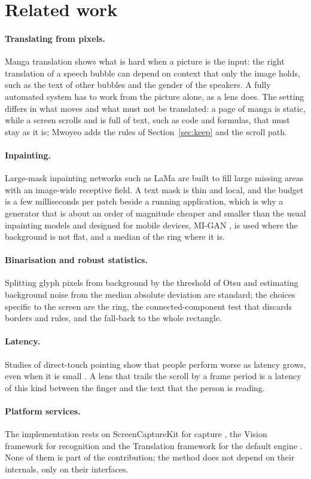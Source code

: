 \section{Related work}\label{sec:related}

\paragraph{Translating from pixels.} Manga translation \citep{manga} shows what is hard when a picture is the input: the right translation of a speech bubble can
depend on context that only the image holds, such as the text of other bubbles and the gender of the speakers. A fully automated system has to work from the picture alone, as a lens does.
The setting differs in what moves and what must not be translated: a page of manga is static, while a screen scrolls and is full of text, such as code and formulas, that must
stay as it is; Mwoyeo adds the rules of Section~\ref{sec:keep} and the scroll path.

\paragraph{Inpainting.} Large-mask inpainting networks such as LaMa \citep{lama} are built to fill large missing areas with an image-wide receptive field. A text mask is thin and
local, and the budget is a few milliseconds per patch beside a running application, which is why a generator that is about an order of magnitude cheaper and smaller than the usual
inpainting models and designed for mobile devices, MI-GAN \citep{migan}, is used where the background is not flat, and a median of the ring where it is.

\paragraph{Binarisation and robust statistics.} Splitting glyph pixels from background by the threshold of Otsu \citep{otsu} and estimating
background noise from the median absolute deviation \citep{mad} are standard; the choices specific to the screen are the ring, the connected-component test that discards
borders and rules, and the fall-back to the whole rectangle.

\paragraph{Latency.} Studies of direct-touch pointing show that people perform worse as latency grows, even when it is small \citep{latency}. A lens that trails the
scroll by a frame period is a latency of this kind between the finger and the text that the person is reading.

\paragraph{Platform services.} The implementation rests on ScreenCaptureKit for capture \citep{sckdoc}, the Vision framework for recognition \citep{visiondoc} and the Translation framework
for the default engine \citep{transdoc}. None of them is part of the contribution; the method does not depend on their internals, only on their interfaces.
